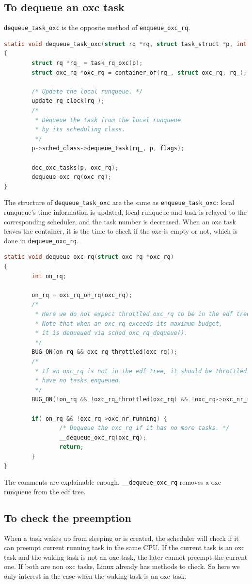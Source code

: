 \subsection{To dequeue an oxc task}
\texttt{dequeue\_task\_oxc} is the opposite method of 
\texttt{enqueue\_oxc\_rq}.
\begin{lstlisting}[language=C]
static void dequeue_task_oxc(struct rq *rq, struct task_struct *p, int flags)
{
        struct rq *rq_ = task_rq_oxc(p);
        struct oxc_rq *oxc_rq = container_of(rq_, struct oxc_rq, rq_);

        /* Update the local runqueue. */
        update_rq_clock(rq_);
        /*
         * Dequeue the task from the local runqueue 
         * by its scheduling class.
         */
        p->sched_class->dequeue_task(rq_, p, flags);

        dec_oxc_tasks(p, oxc_rq);
        dequeue_oxc_rq(oxc_rq);
}
\end{lstlisting}
The structure of \texttt{dequeue\_task\_oxc} are the same as 
\texttt{enqueue\_task\_oxc}: local runqueue's time information is updated,
local runqueue and task is relayed to the corresponding scheduler, 
and the task number is decreased. When an oxc task leaves the container,
it is the time to check if the oxc is empty or not, which is done in
\texttt{dequeue\_oxc\_rq}.
\begin{lstlisting}[language=C]
static void dequeue_oxc_rq(struct oxc_rq *oxc_rq)
{
        int on_rq;

        on_rq = oxc_rq_on_rq(oxc_rq);
        /*
         * Here we do not expect throttled oxc_rq to be in the edf tree.
         * Note that when an oxc_rq exceeds its maximum budget,
         * it is dequeued via sched_oxc_rq_dequeue().
         */
        BUG_ON(on_rq && oxc_rq_throttled(oxc_rq));
        /* 
         * If an oxc_rq is not in the edf tree, it should be throttled or 
         * have no tasks enqueued.
         */
        BUG_ON(!on_rq && !oxc_rq_throttled(oxc_rq) && !oxc_rq->oxc_nr_running);

        if( on_rq && !oxc_rq->oxc_nr_running) {
                /* Dequeue the oxc_rq if it has no more tasks. */
                __dequeue_oxc_rq(oxc_rq);
                return;
        }
}
\end{lstlisting}
The comments are explainable enough. \texttt{\_\_dequeue\_oxc\_rq} removes 
a oxc runqueue from the edf tree.

\subsection{To check the preemption}
When a task wakes up from sleeping or is created, the scheduler will check 
if it can preempt current running task in the same CPU. If the current task
is an oxc task and the waking task is not an oxc task, the later cannot
preempt the current one. If both are non oxc tasks, Linux already has methods
to check. So here we only interest in the case when the waking task is an
oxc task.\\

